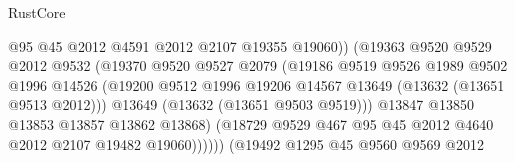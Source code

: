 \begin{lexlean}{RustCore}
\begin{coremodule}
                                        @95
                                        @45
                                        @2012
                                        @4591
                                        @2012
                                        @2107
                                        @19355
                                        @19060))
                                    (@19363
                                      @9520
                                      @9529
                                      @2012
                                      @9532
                                      (@19370
                                        @9520
                                        @9527
                                        @2079
                                        (@19186
                                          @9519
                                          @9526
                                          @1989
                                          @9502
                                          @1996
                                          @14526
                                          (@19200
                                            @9512
                                            @1996
                                            @19206
                                            @14567
                                            @13649
                                            (@13632 (@13651 @9513 @2012)))
                                          @13649
                                          (@13632 (@13651 @9503 @9519)))
                                        @13847
                                        @13850
                                        @13853
                                        @13857
                                        @13862
                                        @13868)
                                      (@18729
                                        @9529
                                        @467
                                        @95
                                        @45
                                        @2012
                                        @4640
                                        @2012
                                        @2107
                                        @19482
                                        @19060))))))
                            (@19492
                              @1295
                              @45
                              @9560
                              @9569
                              @2012

\end{coremodule}
\end{lexlean}
